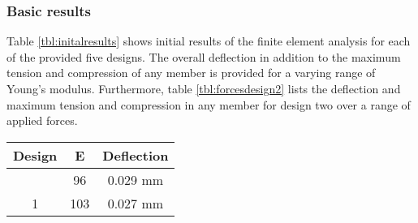 \subsubsection{Basic results}

Table \ref{tbl:initalresults} shows initial results of the finite element analysis for each of the provided five designs.
The overall deflection in addition to the maximum tension and compression of any member is provided for a varying range of Young's modulus.
Furthermore, table \ref{tbl:forcesdesign2} lists the deflection and maximum tension and compression in any member for design two over a range of applied forces.

\begin{table*}[hp]
	\centering
	\caption{Initial Results, Deflection for 1 N, and Effect of Young's Modulus}
	\label{tbl:initalresults}
	\vspace{6pt}
	\begin{tabular}{ccc}
		\toprule
		Design & E & Deflection \\
		\midrule
		 & 96 & 0.029 mm \\
		1 & 103 & 0.027 mm \\

\end{tabular}
\end{table*}

